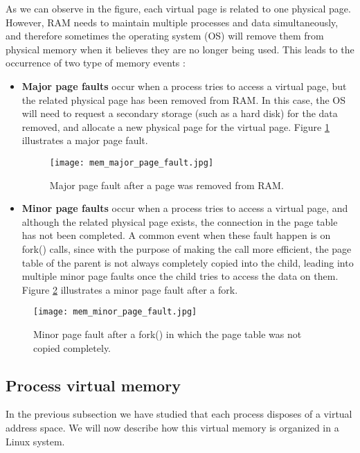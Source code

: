 As we can observe in the figure, each virtual page is related to one physical page. However, RAM needs to maintain multiple processes and data simultaneously, and therefore sometimes the operating system (OS) will remove them from physical memory when it believes they are no longer being used. This leads to the occurrence of two type of memory events \cite{page_faults}:
\begin{itemize}
\item \textbf{Major page faults} occur when a process tries to access a virtual page, but the related physical page has been removed from RAM. In this case, the OS will need to request a secondary storage (such as a hard disk) for the data removed, and allocate a new physical page for the virtual page. Figure \ref{fig:mem_major_page_fault} illustrates a major page fault.
\begin{figure}[htbp]
	\centering
	\texttt{[image: mem\_major\_page\_fault.jpg]}
	\caption{Major page fault after a page was removed from RAM.}
	\label{fig:mem_major_page_fault}
\end{figure}
\item \textbf{Minor page faults} occur when a process tries to access a virtual page, and although the related physical page exists, the connection in the page table has not been completed. A common event when these fault happen is on fork() calls, since with the purpose of making the call more efficient, the page table of the parent is not always completely copied into the child, leading into multiple minor page faults once the child tries to access the data on them. Figure \ref{fig:mem_minor_page_fault} illustrates a minor page fault after a fork.
\end{itemize}
\begin{figure}[htbp]
	\centering
	\texttt{[image: mem\_minor\_page\_fault.jpg]}
	\caption{Minor page fault after a fork() in which the page table was not copied completely.}
	\label{fig:mem_minor_page_fault}
\end{figure}

\subsection{Process virtual memory}
In the previous subsection we have studied that each process disposes of a virtual address space. We will now describe how this virtual memory is organized in a Linux system.

